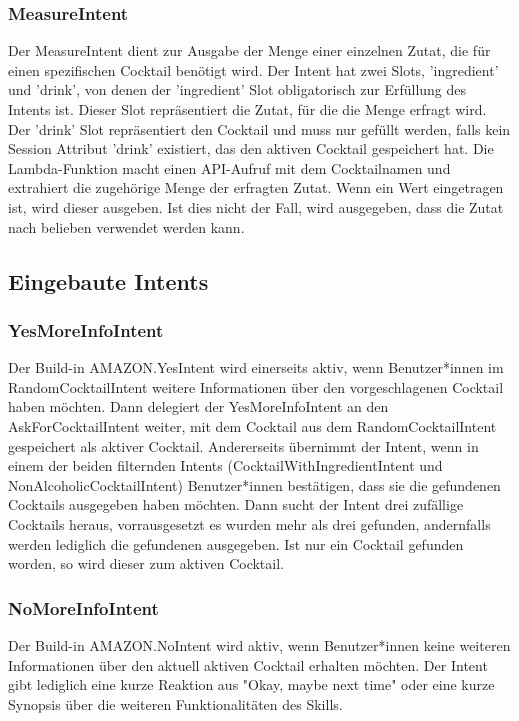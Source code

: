 \documentclass[12pt,letterpaper]{article}
\begin{document}
\subsubsection{MeasureIntent}
Der MeasureIntent dient zur Ausgabe der Menge einer einzelnen Zutat, die für einen spezifischen Cocktail benötigt wird.
Der Intent hat zwei Slots, 'ingredient' und 'drink', von denen der 'ingredient' Slot obligatorisch zur Erfüllung des Intents ist. 
Dieser Slot repräsentiert die Zutat, für die die Menge erfragt wird. Der 'drink' Slot repräsentiert den Cocktail und muss nur gefüllt werden,
falls kein Session Attribut 'drink' existiert, das den aktiven Cocktail gespeichert hat.
Die Lambda-Funktion macht einen API-Aufruf mit dem Cocktailnamen und extrahiert die zugehörige Menge der erfragten Zutat.
Wenn ein Wert eingetragen ist, wird dieser ausgeben. Ist dies nicht der Fall, wird ausgegeben, dass die Zutat nach belieben verwendet werden kann. \\


\subsection{Eingebaute Intents}
\subsubsection{YesMoreInfoIntent}
Der Build-in AMAZON.YesIntent wird einerseits aktiv, wenn Benutzer*innen im RandomCocktailIntent weitere Informationen über den vorgeschlagenen Cocktail haben möchten. Dann delegiert der YesMoreInfoIntent an den AskForCocktailIntent weiter, mit dem Cocktail aus dem RandomCocktailIntent gespeichert als aktiver Cocktail. Andererseits übernimmt der Intent, wenn in einem der beiden filternden Intents (CocktailWithIngredientIntent und NonAlcoholicCocktailIntent) Benutzer*innen bestätigen, dass sie die gefundenen Cocktails ausgegeben haben möchten. Dann sucht der Intent drei zufällige Cocktails heraus, vorrausgesetzt es wurden mehr als drei gefunden, andernfalls werden lediglich die gefundenen ausgegeben. Ist nur ein Cocktail gefunden worden, so wird dieser zum aktiven Cocktail. \\


\subsubsection{NoMoreInfoIntent}
Der Build-in AMAZON.NoIntent wird aktiv, wenn Benutzer*innen keine weiteren Informationen über den aktuell aktiven Cocktail erhalten möchten. Der Intent gibt lediglich eine kurze Reaktion aus "Okay, maybe next time" oder eine kurze Synopsis über die weiteren Funktionalitäten des Skills. \\

 
\end{document}
